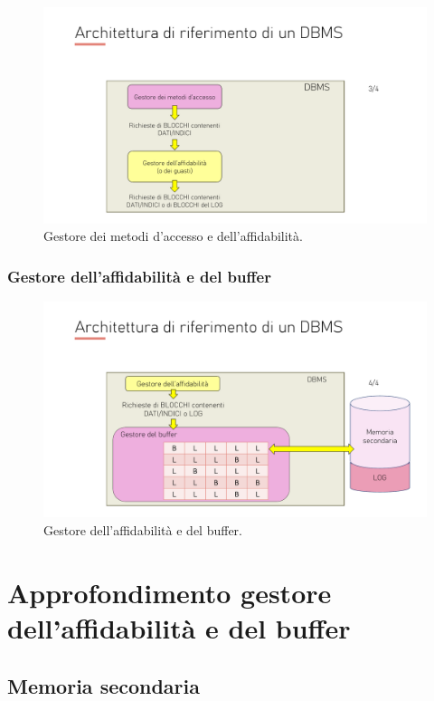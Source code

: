 \documentclass[a4paper]{article}
\begin{document}
	\begin{figure}[!htp]
		\centering
		\includegraphics[width=\textwidth]{img/gestore_metodi_accesso_e_affidabilita.pdf}
		\caption{Gestore dei metodi d'accesso e dell'affidabilità.}
	\end{figure}

	\subsubsection{Gestore dell'affidabilità e del buffer}
	
	\begin{figure}[!htp]
		\centering
		\includegraphics[width=\textwidth]{img/gestore_affidabilita_e_buffer.pdf}
		\caption{Gestore dell'affidabilità e del buffer.}
	\end{figure}\newpage

	\section{Approfondimento gestore dell'affidabilità e del buffer}
	
	\subsection{Memoria secondaria}
	
\end{document}
